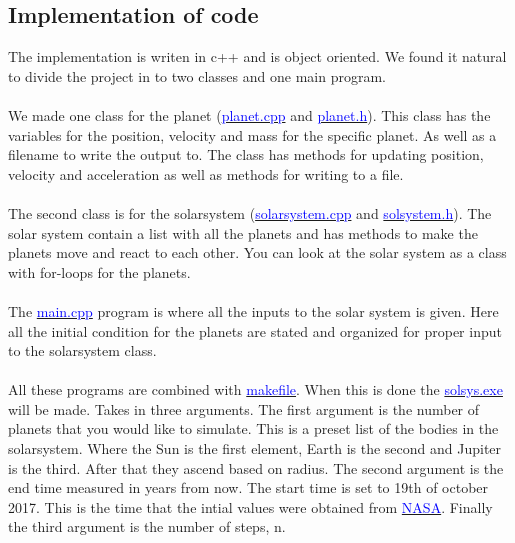 \subsection{Implementation of code}

The implementation is writen in c++ and is object oriented. We found it natural to divide the project in to two classes and one main program. 
\\
\\
We made one class for the planet (\href{https://github.com/erikfsk/Project-3/blob/master/Project3/planet.cpp}{\textcolor{blue}{planet.cpp}} and \href{https://github.com/erikfsk/Project-3/blob/master/Project3/planet.h}{\textcolor{blue}{planet.h}}). This class has the variables for the position, velocity and mass for the specific planet. As well as a filename to write the output to. The class has methods for updating position, velocity and acceleration as well as methods for writing to a file. 
\\
\\
The second class is for the solarsystem (\href{https://github.com/erikfsk/Project-3/blob/master/Project3/solarsystem.cpp}{\textcolor{blue}{solarsystem.cpp}} and \href{https://github.com/erikfsk/Project-3/blob/master/Project3/solarsystem.h}{\textcolor{blue}{solsystem.h}}). The solar system contain a list with all the planets and has methods to make the planets move and react to each other. You can look at the solar system as a class with for-loops for the planets. 
\\
\\
The \href{https://github.com/erikfsk/Project-3/blob/master/Project3/main.cpp}{\textcolor{blue}{main.cpp}} program is where all the inputs to the solar system is given. Here all the initial condition for the planets are stated and organized for proper input to the solarsystem class. 
\\
\\
All these programs are combined with \href{https://github.com/erikfsk/Project-3/blob/master/Project3/makefile}{\textcolor{blue}{makefile}}. When this is done the \href{https://github.com/erikfsk/Project-3/blob/master/Project3/solsys.exe}{\textcolor{blue}{solsys.exe}} will be made. Takes in three arguments. The first argument is the number of planets that you would like to simulate. This is a preset list of the bodies in the solarsystem. Where the Sun is the first element, Earth is the second and Jupiter is the third. After that they ascend based on radius. The second argument is the end time measured in years from now. The start time is set to 19th of october 2017. This is the time that the intial values were obtained from \href{https://ssd.jpl.nasa.gov/horizons.cgi#top}{\textcolor{blue}{NASA}}. Finally the third argument is the number of steps, n. 

